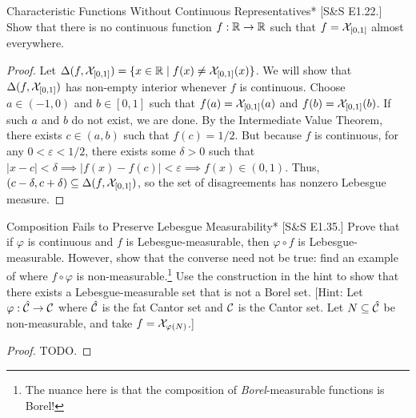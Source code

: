 \begin{problem}{Characteristic Functions Without Continuous Representatives}*
    [S\&S E1.22.] Show that there is no continuous function \(f : \mathbb{R} \to \mathbb{R}\) such that \(f = \mathcal{X}_{[0,1]}\) almost everywhere.
\end{problem}

\begin{proof}
    Let \(\Delta(f, \mathcal{X}_{[0,1]}) = \{x \in \mathbb{R} \mid f(x) \neq \mathcal{X}_{[0,1]}(x)\}\). We will show that \(\Delta(f, \mathcal{X}_{[0,1]})\) has non-empty interior whenever \(f\) is continuous. Choose \(a \in (-1,0)\) and \(b \in [0,1]\) such that \(f(a) = \mathcal{X}_{[0,1]}(a)\) and \(f(b) = \mathcal{X}_{[0,1]}(b)\). If such \(a\) and \(b\) do not exist, we are done. By the Intermediate Value Theorem, there exists \(c \in (a, b)\) such that \(f(c) = 1/2\). But because \(f\) is continuous, for any \(0 < \varepsilon < 1/2\), there exists some \(\delta > 0\) such that \(|x - c| < \delta \implies |f(x) - f(c)| < \varepsilon \implies f(x) \in (0, 1)\). Thus, \((c - \delta, c + \delta) \subseteq \Delta(f, \mathcal{X}_{[0,1]})\), so the set of disagreements has nonzero Lebesgue measure. 
\end{proof}

\begin{problem}{Composition Fails to Preserve Lebesgue Measurability}*
    [S\&S E1.35.] Prove that if \(\varphi\) is continuous and \(f\) is Lebesgue-measurable, then \(\varphi \circ f\) is Lebesgue-measurable. However, show that the converse need not be true: find an example of where \(f \circ \varphi\) is non-measurable.\footnote{The nuance here is that the composition of \textit{Borel}-measurable functions is Borel!} Use the construction in the hint to show that there exists a Lebesgue-measurable set that is not a Borel set. 
    [Hint: Let \(\varphi : \hat{\mathcal{C}} \to \mathcal{C}\) where \(\hat{\mathcal{C}}\) is the fat Cantor set and \(\mathcal{C}\) is the Cantor set. Let \(N \subseteq \hat{\mathcal{C}}\) be non-measurable, and take \(f = \mathcal{X}_{\varphi(N)}\).]
\end{problem}

\begin{proof}
    TODO. 
\end{proof}

